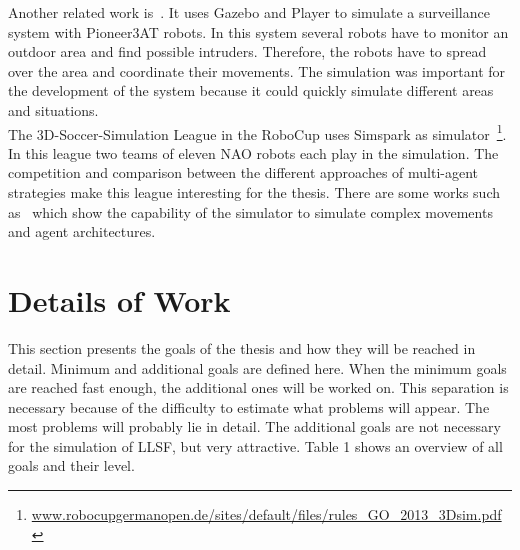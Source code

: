 \documentclass[a4paper,11pt]{article}
\begin{document}
Another related work is~\cite{SurveillanceSystem}. It uses Gazebo and Player to simulate a surveillance system with Pioneer3AT robots. In this system several robots have to monitor an outdoor area and find possible intruders. Therefore, the robots have to spread over the area and coordinate their movements. The simulation was important for the development of the system because it could quickly simulate different areas and situations.\\
The 3D-Soccer-Simulation League in the RoboCup uses Simspark as simulator~\footnote{\url{www.robocupgermanopen.de/sites/default/files/rules_GO_2013_3Dsim.pdf}}. In this league two teams of eleven NAO robots each play in the simulation. The competition and comparison between the different approaches of multi-agent strategies make this league interesting for the thesis. There are some works such as~\cite{SoccerChampion} which show the capability of the simulator to simulate complex movements and agent architectures.

\section{Details of Work}
This section presents the goals of the thesis and how they will be reached in detail. Minimum and additional goals are defined here. When the minimum goals are reached fast enough, the additional ones will be worked on. This separation is necessary because of the difficulty to estimate what problems will appear. The most problems will probably lie in detail. The additional goals are not necessary for the simulation of LLSF, but very attractive. Table 1 shows an overview of all goals and their level.
\end{document}
